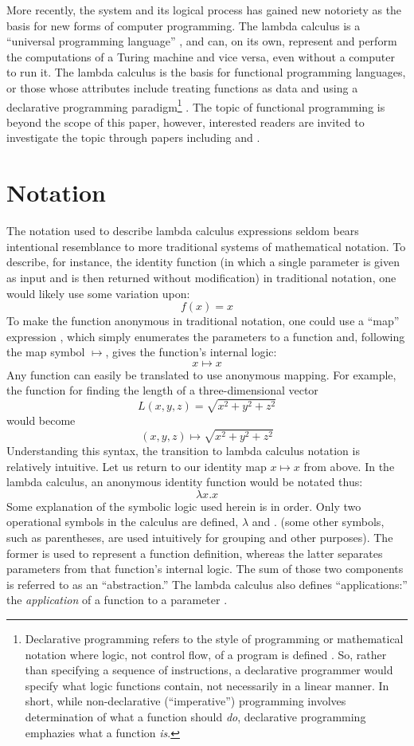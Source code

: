 \documentclass[twocolumn,titlepage,12pt]{article}
\begin{document}
More recently, the system and its logical process has gained new notoriety as the basis for new forms of computer programming. The lambda calculus is a ``universal programming language'' \cite{rojastutorial}, and can, on its own, represent and perform the computations of a Turing machine and vice versa, even without a computer to run it. The lambda calculus is the basis for functional programming languages, or those whose attributes include treating functions as data and using a declarative programming paradigm\footnote{Declarative programming refers to the style of programming or mathematical notation where logic, not control flow, of a program is defined \cite{declarativeprogadv}. So, rather than specifying a sequence of instructions, a declarative programmer would specify what logic functions contain, not necessarily in a linear manner. In short, while non-declarative (``imperative'') programming involves determination of what a function should \textit{do}, declarative programming emphazies what a function \textit{is}.} \cite{hudakevolution}. The topic of functional programming is beyond the scope of this paper, however, interested readers are invited to investigate the topic through papers including \cite{totalfp} and \cite{hudakevolution}.

\section{Notation}
The notation used to describe lambda calculus expressions seldom bears intentional resemblance to more traditional systems of mathematical notation. To describe, for instance, the identity function (in which a single parameter is given as input and is then returned without modification) in traditional notation, one would likely use some variation upon:
$$f(x)=x$$
To make the function anonymous in traditional notation, one could use a ``map'' expression \cite{intrographtheory}, which simply enumerates the parameters to a function and, following the map symbol $\mapsto$, gives the function's internal logic:
$$x\mapsto x$$
Any function can easily be translated to use anonymous mapping. For example, the function for finding the length of a three-dimensional vector
$$L(x,y,z)=\sqrt{x^2+y^2+z^2}$$
would become
$$(x,y,z) \mapsto \sqrt{x^2+y^2+z^2}$$
Understanding this syntax, the transition to lambda calculus notation is relatively intuitive. Let us return to our identity map $x\mapsto x$ from above. In the lambda calculus, an anonymous identity function would be notated thus:
$$\lambda x.x$$
Some explanation of the symbolic logic used herein is in order. Only two operational symbols in the calculus are defined, $\lambda$ and $.$ (some other symbols, such as parentheses, are used intuitively for grouping and other purposes). The former is used to represent a function definition, whereas the latter separates parameters from that function's internal logic. The sum of those two components is referred to as an ``abstraction.'' The lambda calculus also defines ``applications:'' the \textit{application} of a function to a parameter \cite{horowitz}.
\end{document}
